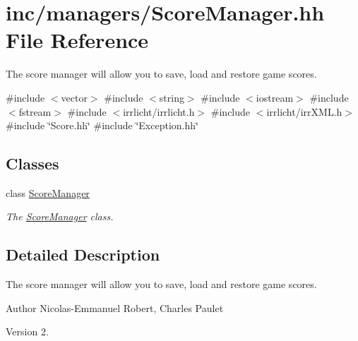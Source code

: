 \hypertarget{ScoreManager_8hh}{}\section{inc/managers/\+Score\+Manager.hh File Reference}
\label{ScoreManager_8hh}


The score manager will allow you to save, load and restore game scores.  


{\ttfamily \#include $<$vector$>$}\newline
{\ttfamily \#include $<$string$>$}\newline
{\ttfamily \#include $<$iostream$>$}\newline
{\ttfamily \#include $<$fstream$>$}\newline
{\ttfamily \#include $<$irrlicht/irrlicht.\+h$>$}\newline
{\ttfamily \#include $<$irrlicht/irr\+X\+M\+L.\+h$>$}\newline
{\ttfamily \#include \char`\"{}Score.\+hh\char`\"{}}\newline
{\ttfamily \#include \char`\"{}Exception.\+hh\char`\"{}}\newline
\subsection*{Classes}
\begin{DoxyCompactItemize}
\item 
class \hyperlink{classScoreManager}{Score\+Manager}
\begin{DoxyCompactList}\small\item\em The \hyperlink{classScoreManager}{Score\+Manager} class. \end{DoxyCompactList}\end{DoxyCompactItemize}


\subsection{Detailed Description}
The score manager will allow you to save, load and restore game scores. 

\begin{DoxyAuthor}{Author}
Nicolas-\/\+Emmanuel Robert, Charles Paulet 
\end{DoxyAuthor}
\begin{DoxyVersion}{Version}
2. 
\end{DoxyVersion}
